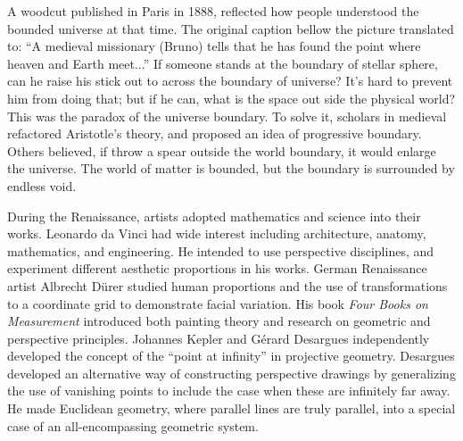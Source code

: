 \documentclass{article}
\begin{document}
A woodcut published in Paris in 1888, reflected how people understood the bounded universe at that time. The original caption bellow the picture translated to: ``A medieval missionary (Bruno) tells that he has found the point where heaven and Earth meet...'' If someone stands at the boundary of stellar sphere, can he raise his stick out to across the boundary of universe? It's hard to prevent him from doing that; but if he can, what is the space out side the physical world? This was the paradox of the universe boundary. To solve it, scholars in medieval refactored Aristotle's theory, and proposed an idea of progressive boundary. Others believed, if throw a spear outside the world boundary, it would enlarge the universe. The world of matter is bounded, but the boundary is surrounded by endless void.

During the Renaissance, artists adopted mathematics and science into their works. Leonardo da Vinci had wide interest including architecture, anatomy, mathematics, and engineering. He intended to use perspective disciplines, and experiment different aesthetic proportions in his works. German Renaissance artist Albrecht Dürer studied human proportions and the use of transformations to a coordinate grid to demonstrate facial variation. His book {\em Four Books on Measurement} introduced both painting theory and research on geometric and perspective principles. Johannes Kepler and Gérard Desargues independently developed the concept of the ``point at infinity'' in projective geometry. Desargues developed an alternative way of constructing perspective drawings by generalizing the use of vanishing points to include the case when these are infinitely far away. He made Euclidean geometry, where parallel lines are truly parallel, into a special case of an all-encompassing geometric system.
\end{document}
